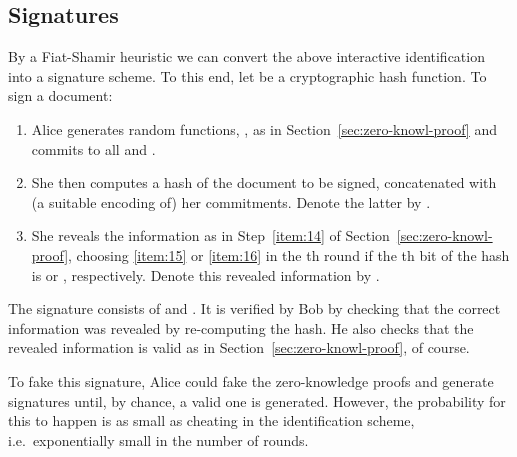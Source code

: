 \documentclass[final,journal,compsoc]{IEEEtran}
\begin{document}
\subsection{Signatures\label{sec:signatures}}

By a Fiat-Shamir heuristic we can convert the above interactive
identification into a signature scheme. To this end, let  be a cryptographic hash function. To sign a document:
\begin{enumerate}
\item Alice generates  random functions, , as in
  Section~\ref{sec:zero-knowl-proof} and commits to all 
   and .
\item She then computes a hash of the document to be signed,
  concatenated with (a suitable encoding of) her commitments. Denote
  the latter by .
\item She reveals the information as in Step~\ref{item:14} of
    Section~\ref{sec:zero-knowl-proof}, choosing \ref{item:15} or
      \ref{item:16} in the th round if the th bit of the hash is
       or , respectively. Denote this
        revealed information by .

\end{enumerate}
The signature consists of  and . It is verified by Bob by checking that the correct
information was revealed by re-computing the hash. He also checks that
the revealed information is valid as in
Section~\ref{sec:zero-knowl-proof}, of course.


To fake this signature, Alice could fake the zero-knowledge proofs and
generate signatures until, by chance, a valid one is
generated. However, the probability for this to happen is as small as
cheating in the identification scheme, i.e.\ exponentially small in
the number of rounds.
\end{document}
